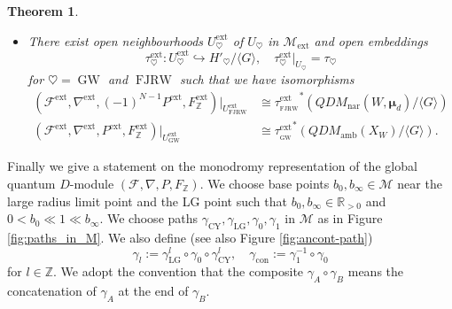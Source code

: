 \documentclass[11pt]{amsart}
\newtheorem{thm}{Theorem}[section] %
\theoremstyle{definition} %
\theoremstyle{remark} %
\newcommand{\RR}{\mathbb R}
\newcommand{\ZZ}{\mathbb Z}
\newcommand{\nar}{\operatorname{nar}}
\def\GW{\operatorname{\text{GW}}}
\newcommand{\bmu}{\boldsymbol{\mu}}
\newcommand{\cM}{\mathcal{M}}
\newcommand{\cF}{\mathcal{F}}
\newcommand{\amb}{\operatorname{amb}}
\newcommand{\ext}{{\operatorname{ext}}}
\newcommand{\FJRW}{{\operatorname{FJRW}}}
\newcommand{\sFJRW}{\operatorname{_{FJRW}}}
\renewcommand{\GW}{{\operatorname{GW}}}
\newcommand{\sGW}{\operatorname{_{GW}}}
\newcommand{\CY}{\operatorname{CY}}
\newcommand{\LG}{\operatorname{LG}}
\newcommand{\con}{\operatorname{con}}
\begin{document}
\begin{thm}
\begin{itemize}

\item 
There exist open neighbourhoods  
$U_\heartsuit^\ext$ of $U_{\heartsuit}$ in $\cM_\ext$ 
and open embeddings 
\[
\tau^{\ext}_\heartsuit \colon 
U_\heartsuit^\ext \hookrightarrow H'_\heartsuit/\langle G\rangle, 
\quad \tau^\ext_{\heartsuit}|_{U_{\heartsuit}} = \tau_{\heartsuit}
\]
for $\heartsuit = \GW$ and $\FJRW$ 
such that we have isomorphisms  
\begin{align*} 
(\cF^\ext,\nabla^\ext,(-1)^{N-1} P^\ext, F_\ZZ^\ext) 
|_{U^\ext_{\FJRW}}  
& \cong {\tau^{\ext}_{\sFJRW}}^*
(QDM_{\nar}(W,\bmu_d)/\langle G\rangle) \\ 
(\cF^\ext,\nabla^\ext,P^\ext, F_\ZZ^\ext) |_{U^\ext_{\GW}}  
& \cong {\tau^{\ext}_{\sGW}}^*  
(QDM_{\amb}(X_W) /\langle G \rangle). 
\end{align*} 
\end{itemize} 
\end{thm} 

Finally we give a statement on the monodromy representation 
of the global quantum $D$-module $(\cF,\nabla, P, F_\ZZ)$. 
We choose base points $b_0, b_\infty \in\cM$ 
near the large radius limit point and 
the LG point such that 
$b_0, b_\infty \in \RR_{>0}$ and 
$0<b_0\ll 1 \ll b_\infty$. 
We choose paths $\gamma_{\CY}, \gamma_{\LG}, 
\gamma_0, \gamma_1$ in $\cM$ as in Figure \ref{fig:paths_in_M}. 
We also define (see also Figure \ref{fig:ancont-path}) 
\[
\gamma_l:= \gamma_{\LG}^{l} \circ \gamma_0 \circ \gamma_{\CY}^l, 
\quad 
\gamma_{\con} := \gamma_1^{-1} \circ \gamma_0 
\]
for $l\in \ZZ$. We adopt the convention that 
the composite $\gamma_A \circ \gamma_B$ 
means the concatenation of $\gamma_A$ at 
the end of $\gamma_B$. 
\end{document}
